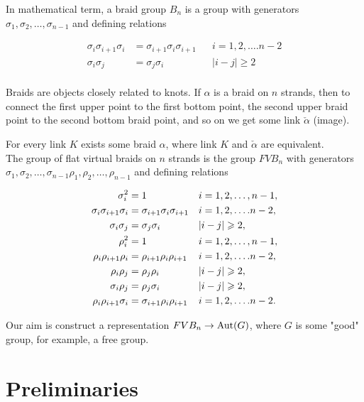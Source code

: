 \documentclass{article}
\begin{document}
In mathematical term, a braid group $B_n$ is a group with generators $\sigma _1,\sigma _2,\dots,\sigma _{n-1}$ and defining relations 

\begin{align*}
\sigma _i\sigma _{i+1}\sigma _i &= \sigma _{i+1}\sigma _i\sigma _{i+1}&&i = 1, 2, \dots. n-2\\
\sigma _i\sigma _j &= \sigma _j\sigma _i&&|i-j|\geqslant   2\\
\end{align*}


Braids are objects closely related to knots. If $\alpha$ is a braid on $n$ strands, then to connect the first upper point to the first bottom point, the second upper braid point to the second bottom braid point, and so on we get some link $\check  \alpha$ (image).

For every link $K$ exists some braid $\alpha$, where link $K$ and $\check  \alpha$ are equivalent.\\


The group of flat virtual braids on $n$ strands is the group $FVB_n$ with generators  $\sigma _1,\sigma _2,\dots,\sigma _{n-1}\rho_1,\rho _2,\dots,\rho _{n-1}$ and defining relations 


\begin{align}
\notag\sigma_i^2&=1 && i = 1, 2, \dots,n-1,\\
\notag\sigma_i\sigma _{i+1}\sigma _i &= \sigma _{i+1}\sigma _i\sigma _{i+1}&& i = 1, 2, \dots. n-2, \\
\notag\sigma _i\sigma _j &= \sigma _j\sigma _i && |i-j|\geqslant   2,\\
\label{def}\rho_i^2&=1 &&i = 1, 2, \dots,n-1, \\
\notag\rho_i\rho _{i+1}\rho _i &= \rho _{i+1}\rho_i\rho _{i+1} &&i = 1, 2, \dots. n-2,\\
\notag\rho _i\rho _j &= \rho _j\rho _i && |i-j|\geqslant 2,\\
\notag\sigma _i\rho _j &= \rho _j\sigma _i &&|i-j|\geqslant   2,\\
\notag\rho_i\rho _{i+1}\sigma _i &= \sigma _{i+1}\rho_i\rho _{i+1} && i = 1, 2, \dots. n-2.
\end{align}


Our aim is construct a representation $FVB_n \rightarrow {\rm Aut} (G)$, where $G$ is some "good" group, for example, a free group.
\section{Preliminaries}
\end{document}
